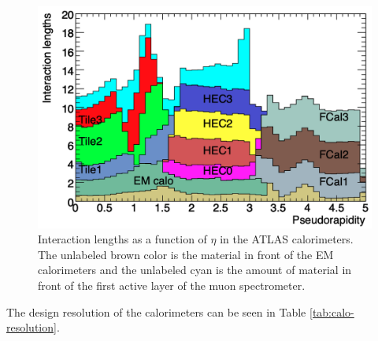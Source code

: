 	\begin{figure}[!ht]
	\centering
	\includegraphics[width=.65\textwidth,keepaspectratio=true]{chapters/chapter3_experiment/images/Calo_Interaction_Lengths.png}
	\caption{ Interaction lengths as a function of $\eta$ in the ATLAS calorimeters. The unlabeled brown color is the material in front of the EM calorimeters and the unlabeled cyan is the amount of material in front of the first active layer of the muon spectrometer. \cite{atlas-experiment}}
	\label{fig:calo-interaction-length}
	\end{figure}

	The design resolution of the calorimeters can be seen in Table \ref{tab:calo-resolution}.

	\begin{table}[!thp]
	\centering
	\caption{ Design resolution of EM and hadronic calorimeters in the ATLAS Detector.}
	\label{tab:calo-resolution}
	\end{table}

